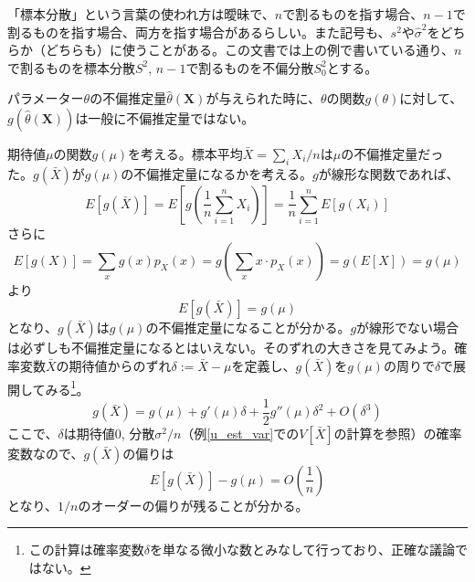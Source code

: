 \documentclass[uplatex,dvipdfmx]{jlreq}
\begin{document}
\begin{note}
    「標本分散」という言葉の使われ方は曖昧で、$n$で割るものを指す場合、$n-1$で割るものを指す場合、両方を指す場合があるらしい。また記号も、$s^2$や$\hat{\sigma}^2$をどちらか（どちらも）に使うことがある。この文書では上の例で書いている通り、$n$で割るものを標本分散$S^2$, $n-1$で割るものを不偏分散$S_0^2$とする。
\end{note}

パラメーター$\theta$の不偏推定量$\hat{\theta}(\boldsymbol{X})$が与えられた時に、$\theta$の関数$g(\theta)$に対して、$g(\hat{\theta}(\boldsymbol{X}))$は一般に不偏推定量ではない。

\begin{example}[期待値の関数の推定]
    期待値$\mu$の関数$g(\mu)$を考える。標本平均$\bar{X}=\sum_i X_i/n$は$\mu$の不偏推定量だった。$g(\bar{X})$が$g(\mu)$の不偏推定量になるかを考える。$g$が線形な関数であれば、
    \begin{equation}
        E[g(\bar{X})]
        = E\left[g\left(\frac{1}{n}\sum_{i=1}^n X_i\right)\right]
        = \frac{1}{n}\sum_{i=1}^n E[g(X_i)]
    \end{equation}
    さらに
    \begin{equation}
        E[g(X)] = \sum_x g(x)p_X(x)
        = g\left(\sum_x x\cdot p_X(x)\right)
        = g(E[X]) = g(\mu)
    \end{equation}
    より
    \begin{equation}
        E[g(\bar{X})] = g(\mu)
    \end{equation}
    となり、$g(\bar{X})$は$g(\mu)$の不偏推定量になることが分かる。$g$が線形でない場合は必ずしも不偏推定量になるとはいえない。そのずれの大きさを見てみよう。確率変数$\bar{X}$の期待値からのずれ$\delta := \bar{X} - \mu$を定義し、$g(\bar{X})$を$g(\mu)$の周りで$\delta$で展開してみる\footnote{この計算は確率変数$\delta$を単なる微小な数とみなして行っており、正確な議論ではない。}。
    \begin{equation}
        g(\bar{X})
        = g(\mu) + g'(\mu)\delta + \frac{1}{2}g''(\mu)\delta^2 + O(\delta^3)
    \end{equation}
    ここで、$\delta$は期待値0, 分散$\sigma^2/n$（例\ref{u_est_var}での$V[\bar{X}]$の計算を参照）の確率変数なので、$g(\bar{X})$の偏りは
    \begin{equation}
        E[g(\bar{X})] - g(\mu) = O\left(\frac{1}{n}\right)
    \end{equation}
    となり、$1/n$のオーダーの偏りが残ることが分かる。
\end{example}
\end{document}
